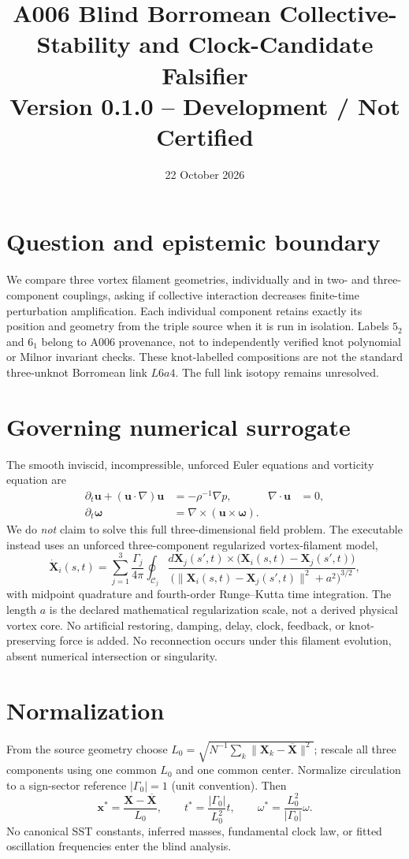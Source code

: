 \documentclass[11pt,a4paper]{article}
\title{A006 Blind Borromean Collective-Stability and Clock-Candidate Falsifier\\Version 0.1.0 -- Development / Not Certified}
\date{22 October 2026}
\begin{document}
\maketitle
\section{Question and epistemic boundary}
We compare three vortex filament geometries, individually and in two- and three-component couplings, asking if collective interaction decreases finite-time perturbation amplification. Each individual component retains exactly its position and geometry from the triple source when it is run in isolation. Labels $5_2$ and $6_1$ belong to A006 provenance, not to independently verified knot polynomial or Milnor invariant checks. These knot-labelled compositions are not the standard three-unknot Borromean link $L6a4$. The full link isotopy remains unresolved.
\section{Governing numerical surrogate}
The smooth inviscid, incompressible, unforced Euler equations and vorticity equation are
\begin{align}
\partial_t\mathbf{u}+(\mathbf{u}\cdot\nabla)\mathbf{u}&=-\rho^{-1}\nabla p, & \nabla\cdot\mathbf{u}&=0,\\
\partial_t\boldsymbol\omega&=\nabla\times(\mathbf{u}\times\boldsymbol\omega).
\end{align}
We do \emph{not} claim to solve this full three-dimensional field problem. The executable instead uses an unforced three-component regularized vortex-filament model,
\begin{equation}
\dot{\mathbf X}_i(s,t)=\sum_{j=1}^{3}\frac{\Gamma_j}{4\pi}\oint_{\mathcal C_j}
\frac{d\mathbf X_j(s',t)\times\bigl(\mathbf X_i(s,t)-\mathbf X_j(s',t)\bigr)}
{\bigl(\lVert\mathbf X_i(s,t)-\mathbf X_j(s',t)\rVert^2+a^2\bigr)^{3/2}},
\end{equation}
with midpoint quadrature and fourth-order Runge--Kutta time integration. The length $a$ is the declared mathematical regularization scale, not a derived physical vortex core. No artificial restoring, damping, delay, clock, feedback, or knot-preserving force is added. No reconnection occurs under this filament evolution, absent numerical intersection or singularity.
\section{Normalization}
From the source geometry choose $L_0=\sqrt{N^{-1}\sum_k\lVert\mathbf X_k-\overline{\mathbf X}\rVert^2}$; rescale all three components using one common $L_0$ and one common center. Normalize circulation to a sign-sector reference $|\Gamma_0|=1$ (unit convention). Then
\begin{equation}
\mathbf{x}^*=\frac{\mathbf X-\overline{\mathbf X}}{L_0},\qquad
 t^*=\frac{|\Gamma_0|}{L_0^2}t,\qquad
 \omega^*=\frac{L_0^2}{|\Gamma_0|}\omega.
\end{equation}
No canonical SST constants, inferred masses, fundamental clock law, or fitted oscillation frequencies enter the blind analysis.
\end{document}
